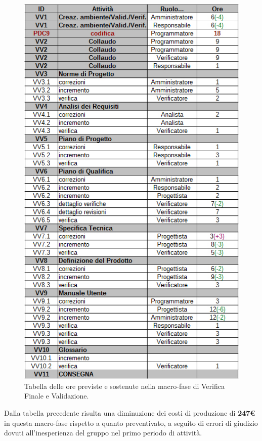 \clearpage
\begin{figure}[H]
\begin{center}
\includegraphics[scale=0.75]{img/consuntivo-verival.jpg}
\caption{Tabella delle ore previste e sostenute nella macro-fase di Verifica Finale e Validazione.}
\end{center}
\end{figure}

\clearpage
Dalla tabella precedente risulta una diminuzione dei costi di produzione di \textbf{247€} in questa macro-fase rispetto a quanto preventivato, a seguito di errori di giudizio dovuti all'inesperienza del gruppo nel primo periodo di attività.

